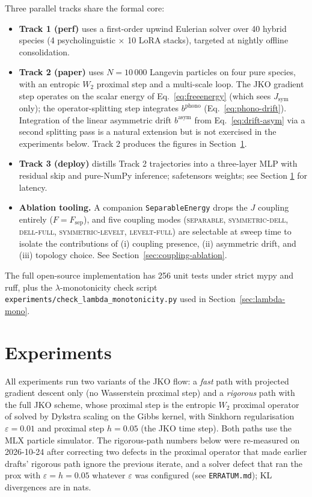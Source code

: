 \documentclass[11pt]{article}
\begin{document}
Three parallel tracks share the formal core:
\begin{itemize}
  \item \textbf{Track 1 (perf)} uses a first-order upwind Eulerian
        solver over 40 hybrid species (4 psycholinguistic $\times$ 10
        LoRA stacks), targeted at nightly offline consolidation.
  \item \textbf{Track 2 (paper)} uses $N=10\,000$ Langevin particles on
        four pure species, with an entropic $W_2$ proximal step and a multi-scale
        loop. The JKO gradient step operates on the scalar energy of
        Eq.~\eqref{eq:freeenergy} (which sees $J_{\mathrm{sym}}$ only);
        the operator-splitting step integrates $b^{\mathrm{phono}}$
        (Eq.~\eqref{eq:phono-drift}). Integration of the linear
        asymmetric drift $b^{\mathrm{asym}}$ from
        Eq.~\eqref{eq:drift-asym} via a second splitting pass is a
        natural extension but is not exercised in the experiments
        below. Track 2 produces the figures in
        Section~\ref{sec:exp}.
  \item \textbf{Track 3 (deploy)} distills Track 2 trajectories into a
        three-layer MLP with residual skip and pure-NumPy inference;
        safetensors weights; see Section \ref{sec:exp} for latency.
  \item \textbf{Ablation tooling.} A companion
        \texttt{SeparableEnergy} drops the $J$ coupling entirely
        ($F = F_{\mathrm{sep}}$), and five coupling modes
        (\textsc{separable}, \textsc{symmetric-dell},
        \textsc{dell-full}, \textsc{symmetric-levelt},
        \textsc{levelt-full}) are selectable at sweep time to isolate
        the contributions of (i) coupling presence, (ii) asymmetric
        drift, and (iii) topology choice. See
        Section~\ref{sec:coupling-ablation}.
\end{itemize}

The full open-source implementation has 256 unit tests under strict
mypy and ruff, plus the $\lambda$-monotonicity check script
\texttt{experiments/check\_lambda\_monotonicity.py} used in
Section~\ref{sec:lambda-mono}.

\section{Experiments}
\label{sec:exp}

All experiments run two variants of the JKO flow: a \emph{fast} path with
projected gradient descent only (no Wasserstein proximal step) and a
\emph{rigorous} path with the full JKO scheme, whose proximal step is the
entropic $W_2$ proximal operator of \cite{peyre2015entropic} solved by
Dykstra scaling on the Gibbs kernel, with Sinkhorn regularisation
$\varepsilon = 0.01$ and proximal step $h = 0.05$ (the JKO time step).
Both paths use
the MLX particle simulator. The rigorous-path numbers below were
re-measured on 2026-10-24 after correcting two defects in the proximal
operator that made earlier drafts' rigorous path ignore the previous
iterate, and a solver defect that ran the prox with
$\varepsilon = h = 0.05$ whatever $\varepsilon$ was configured (see
\texttt{ERRATUM.md}); KL divergences are in nats.
\end{document}

